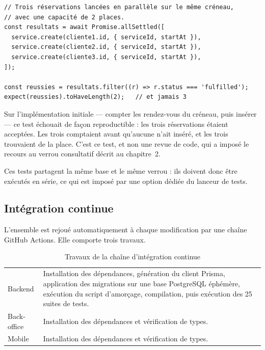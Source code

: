 \begin{lstlisting}[caption={Principe du test de concurrence sur les réservations},captionpos=b]
// Trois réservations lancées en parallèle sur le même créneau,
// avec une capacité de 2 places.
const resultats = await Promise.allSettled([
  service.create(cliente1.id, { serviceId, startAt }),
  service.create(cliente2.id, { serviceId, startAt }),
  service.create(cliente3.id, { serviceId, startAt }),
]);

const reussies = resultats.filter((r) => r.status === 'fulfilled');
expect(reussies).toHaveLength(2);   // et jamais 3
\end{lstlisting}

Sur l'implémentation initiale --- compter les rendez-vous du créneau, puis
insérer --- ce test échouait de façon reproductible : les trois réservations
étaient acceptées. Les trois comptaient avant qu'aucune n'ait inséré, et les
trois trouvaient de la place. C'est ce test, et non une revue de code, qui a
imposé le recours au verrou consultatif décrit au chapitre~2.

Ces tests partagent la même base et le même verrou : ils doivent donc être
exécutés en série, ce qui est imposé par une option dédiée du lanceur de tests.

\subsection{Intégration continue}

L'ensemble est rejoué automatiquement à chaque modification par une chaîne
GitHub Actions. Elle comporte trois travaux.

\begin{table}[H]
\centering
\caption{Travaux de la chaîne d'intégration continue}
\label{tab:ci}
\begin{tabularx}{\textwidth}{L{2.8cm} X}
\toprule
{} &  \\
\midrule
Backend &
Installation des dépendances, génération du client Prisma, application des
migrations sur une base PostgreSQL éphémère, exécution du script d'amorçage,
compilation, puis exécution des 25 suites de tests. \\

Back-office & Installation des dépendances et vérification de types. \\

Mobile & Installation des dépendances et vérification de types. \\
\bottomrule
\end{tabularx}
\end{table}

